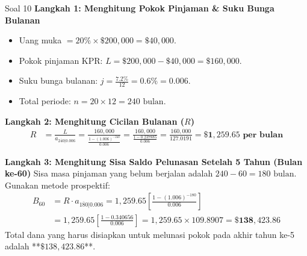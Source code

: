 \documentclass[11pt,a4paper]{article}
\begin{document}
\begin{solutionbox}{Soal 10}
\textbf{Langkah 1: Menghitung Pokok Pinjaman \& Suku Bunga Bulanan}
\begin{itemize}
    \item Uang muka $= 20\% \times \$200{,}000 = \$40{,}000$.
    \item Pokok pinjaman KPR: $L = \$200{,}000 - \$40{,}000 = \$160{,}000$.
    \item Suku bunga bulanan: $j = \frac{7.2\%}{12} = 0.6\% = 0.006$.
    \item Total periode: $n = 20 \times 12 = 240 \text{ bulan}$.
\end{itemize}

\textbf{Langkah 2: Menghitung Cicilan Bulanan ($R$)}
\begin{align*}
    R &= \frac{L}{a_{\overline{240}|0.006}} = \frac{160{,}000}{\frac{1 - (1.006)^{-240}}{0.006}} = \frac{160{,}000}{\frac{1 - 0.237885}{0.006}} = \frac{160{,}000}{127.0191} = \mathbf{\$1{,}259.65 \text{ per bulan}}
\end{align*}

\textbf{Langkah 3: Menghitung Sisa Saldo Pelunasan Setelah 5 Tahun (Bulan ke-60)}
Sisa masa pinjaman yang belum berjalan adalah $240 - 60 = 180 \text{ bulan}$.
Gunakan metode prospektif:
\begin{align*}
    B_{60} &= R \cdot a_{\overline{180}|0.006} = 1{,}259.65 \left[ \frac{1 - (1.006)^{-180}}{0.006} \right] \\[0.4em]
           &= 1{,}259.65 \left[ \frac{1 - 0.340656}{0.006} \right] = 1{,}259.65 \times 109.8907 = \mathbf{\$138{,}423.86}
\end{align*}
Total dana yang harus disiapkan untuk melunasi pokok pada akhir tahun ke-5 adalah **$\$138{,}423.86$**.
\end{solutionbox}
\end{document}
